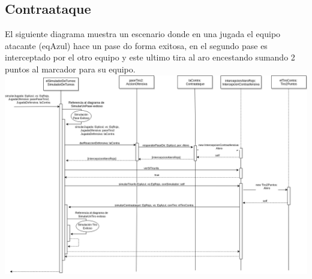 \subsection{Contraataque}
El siguiente diagrama muestra un escenario donde en una jugada el equipo atacante (eqAzul) hace un pase do forma exitosa, en el segundo pase es interceptado por el otro equipo y este ultimo tira al aro encestando sumando 2 puntos al marcador para su equipo.
\includegraphics[width=\textwidth]{imgs/ContraataqueSecuencia.png}


